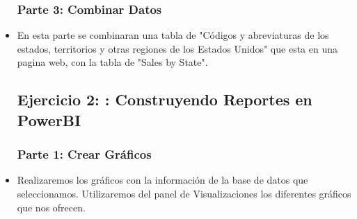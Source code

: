 \begin{itemize}
   \subsubsection{Parte 3: Combinar Datos }
	\item En esta parte se combinaran una tabla de "Códigos y abreviaturas de los estados, territorios y otras regiones de los Estados Unidos" que esta en una pagina web, con la tabla de "Sales by State".

\begin{figure}[h]
		\begin{center}
		\end{center}
		\end{figure}

\subsection{Ejercicio 2: : Construyendo Reportes en PowerBI}
\subsubsection{Parte 1: Crear Gráficos }
	\item Realizaremos los gráficos con la información de la base de datos que seleccionamos. Utilizaremos del panel de Visualizaciones los diferentes gráficos que nos ofrecen.


\end{itemize}
